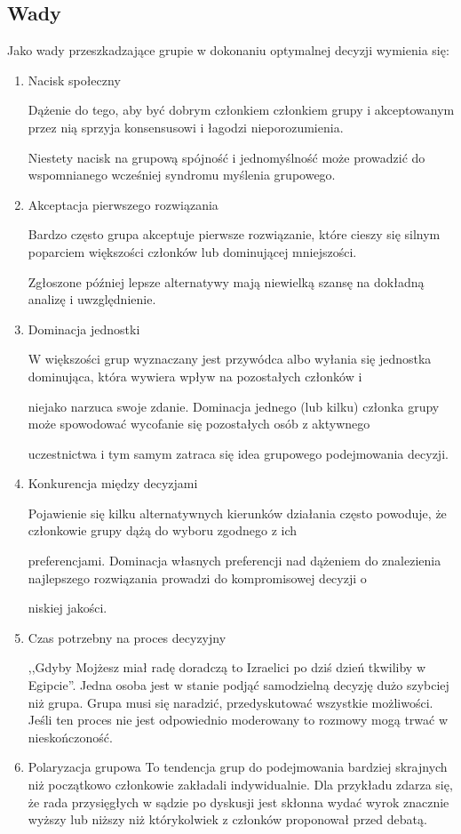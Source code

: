 \subsection{Wady}
Jako wady przeszkadzające grupie w dokonaniu optymalnej decyzji wymienia się:
\begin{enumerate}
  \item Nacisk społeczny
  
  Dążenie do tego, aby być dobrym członkiem członkiem grupy i akceptowanym przez nią sprzyja konsensusowi i łagodzi nieporozumienia. 

Niestety nacisk na grupową spójność i jednomyślność może prowadzić do wspomnianego wcześniej syndromu myślenia grupowego.
  
  \item Akceptacja pierwszego rozwiązania
  
  Bardzo często grupa akceptuje pierwsze rozwiązanie, które cieszy się silnym poparciem większości członków lub dominującej mniejszości. 

Zgłoszone później lepsze alternatywy mają niewielką szansę na dokładną analizę i uwzględnienie.
  
  \item Dominacja jednostki
  
  W większości grup wyznaczany jest przywódca albo wyłania się jednostka dominująca, która wywiera wpływ na pozostałych członków i 

niejako narzuca swoje zdanie. Dominacja jednego (lub kilku) członka grupy może spowodować wycofanie się pozostałych osób z aktywnego 

uczestnictwa i tym samym zatraca się idea grupowego podejmowania decyzji.
  
  \item Konkurencja między decyzjami
  
  Pojawienie się kilku alternatywnych kierunków działania często powoduje, że członkowie grupy dążą do wyboru zgodnego z ich 

preferencjami. Dominacja własnych preferencji nad dążeniem do znalezienia najlepszego rozwiązania prowadzi do kompromisowej decyzji o 

niskiej jakości.
  
  \item Czas potrzebny na proces decyzyjny
  
  ,,Gdyby Mojżesz miał radę doradczą to Izraelici po dziś dzień tkwiliby w
  Egipcie''. Jedna osoba jest w stanie podjąć samodzielną decyzję dużo szybciej
  niż grupa. Grupa musi się naradzić, przedyskutować wszystkie możliwości. 
  Jeśli ten proces nie jest odpowiednio moderowany to rozmowy mogą trwać w nieskończoność.

  \item Polaryzacja grupowa
  To tendencja grup do podejmowania bardziej skrajnych niż początkowo członkowie 
  zakładali indywidualnie. Dla przykładu zdarza się, że rada przysięgłych 
  w sądzie po dyskusji jest skłonna wydać wyrok znacznie wyższy lub niższy 
  niż którykolwiek z członków proponował przed debatą.

\end{enumerate}


